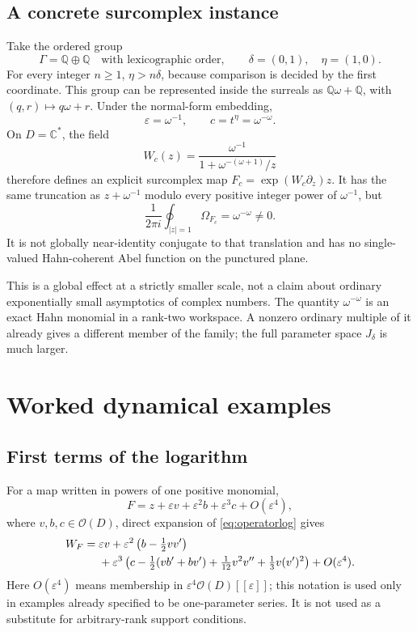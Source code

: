 \documentclass[11pt,a4paper]{article}
\numberwithin{equation}{section}
\theoremstyle{definition}
\theoremstyle{remark}
\newcommand{\C}{\mathbb C}
\newcommand{\Q}{\mathbb Q}
\newcommand{\Oh}{\mathcal O}
\newcommand{\eps}{\varepsilon}
\newcommand{\Oe}[1]{O(\eps^{#1})}
\begin{document}
\subsection{A concrete surcomplex instance}

Take the ordered group
\[
 \Gamma=\Q\oplus\Q\quad\text{with lexicographic order},\qquad
 \delta=(0,1),\quad\eta=(1,0).
\]
For every integer $n\geq1$, $\eta>n\delta$, because comparison is decided
by the first coordinate.  This group can be represented inside the
surreals as $\Q\omega+\Q$, with $(q,r)\mapsto q\omega+r$.
Under the normal-form embedding,
\[
 \eps=\omega^{-1},\qquad c=t^\eta=\omega^{-\omega}.
\]
On $D=\C^*$, the field
\begin{equation}\label{eq:surreal-flat-example}
 W_c(z)=\frac{\omega^{-1}}{1+\omega^{-(\omega+1)}/z}
\end{equation}
therefore defines an explicit surcomplex map $F_c=\exp(W_c\partial_z)z$.
It has the same truncation as $z+\omega^{-1}$ modulo every positive integer
power of $\omega^{-1}$, but
\[
 \frac1{2\pi i}\oint_{|z|=1}\Omega_{F_c}=\omega^{-\omega}\ne0.
\]
It is not globally near-identity conjugate to that translation and has no
single-valued Hahn-coherent Abel function on the punctured plane.

This is a global effect at a strictly smaller scale, not a claim about
ordinary exponentially small asymptotics of complex numbers.  The quantity
$\omega^{-\omega}$ is an exact Hahn monomial in a rank-two workspace.
A nonzero ordinary multiple of it already gives a different member of the
family; the full parameter space $J_\delta$ is much larger.

\section{Worked dynamical examples}
\label{sec:examples}

\subsection{First terms of the logarithm}

For a map written in powers of one positive monomial,
\[
 F=z+\eps v+\eps^2b+\eps^3c+\Oe4,
\]
where $v,b,c\in\Oh(D)$, direct expansion of
\eqref{eq:operatorlog} gives
\begin{align}
 W_F={}&\eps v+\eps^2\left(b-\tfrac12vv'\right)\notag\\
 &+\eps^3\left(c-\tfrac12(vb'+bv')
       +\tfrac1{12}v^2v''+\tfrac13v(v')^2\right)+\Oe4.
 \label{eq:log-first-terms}
\end{align}
Here $\Oe4$ means membership in $\eps^4\Oh(D)[[\eps]]$; this notation
is used only in examples already specified to be one-parameter series.
It is not used as a substitute for arbitrary-rank support conditions.
\end{document}
